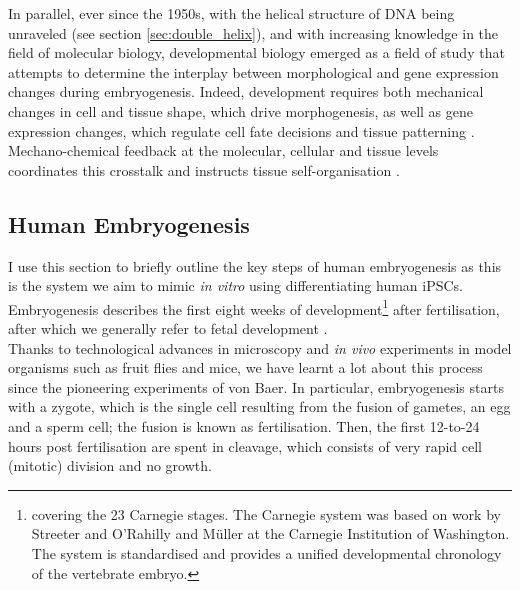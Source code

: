 In parallel, ever since the 1950s, with the helical structure of DNA being unraveled (see section \ref{sec:double_helix}), and with increasing knowledge in the field of molecular biology, developmental biology emerged as a field of study
that attempts to determine the interplay between morphological and gene expression changes during embryogenesis.
Indeed, development requires both mechanical changes in cell and tissue shape, which drive morphogenesis, as well as gene expression changes, which regulate cell fate decisions and tissue patterning \cite{niakan2013analysis, petropoulos2016single}. 
Mechano-chemical feedback at the molecular, cellular and tissue levels coordinates this crosstalk and instructs tissue self-organisation \cite{hannezo2019mechanochemical}.

\newpage

\subsection{Human Embryogenesis}
\label{sec:human_embryogenesis}


I use this section to briefly outline the key steps of human embryogenesis as this is the system we aim to mimic \textit{in vitro} using differentiating human iPSCs.
Embryogenesis describes the first eight weeks of development\footnote{covering the 23 Carnegie stages.
The Carnegie system was based on work by Streeter \cite{streeter1942developmental} and O'Rahilly and Müller \cite{o1973developmental, o2010developmental} at the Carnegie Institution of Washington.
The system is standardised and provides a unified developmental chronology of the vertebrate embryo.} after fertilisation, after which we generally refer to fetal development \cite{gilbert2008developmental}.\\

Thanks to technological advances in microscopy and \textit{in vivo} experiments in model organisms such as fruit flies and mice, we have learnt a lot about this process since the pioneering experiments of von Baer.
In particular, embryogenesis starts with a zygote, which is the single cell resulting from the fusion of gametes, an egg and a sperm cell; the fusion is known as fertilisation.
Then, the first 12-to-24 hours post fertilisation are spent in cleavage, which consists of very rapid cell (mitotic) division and no growth.\\


